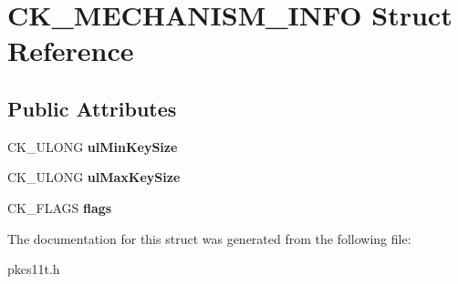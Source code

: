 \hypertarget{struct_c_k___m_e_c_h_a_n_i_s_m___i_n_f_o}{}\section{C\+K\+\_\+\+M\+E\+C\+H\+A\+N\+I\+S\+M\+\_\+\+I\+N\+FO Struct Reference}
\label{struct_c_k___m_e_c_h_a_n_i_s_m___i_n_f_o}
\subsection*{Public Attributes}
\begin{DoxyCompactItemize}
\item 
\mbox{\label{struct_c_k___m_e_c_h_a_n_i_s_m___i_n_f_o_a4cfb88703adbce245090f1761cf155c3}} 
C\+K\+\_\+\+U\+L\+O\+NG {\bfseries ul\+Min\+Key\+Size}
\item 
\mbox{\label{struct_c_k___m_e_c_h_a_n_i_s_m___i_n_f_o_ab5833180294f1a83f91a5ed8ccda92d6}} 
C\+K\+\_\+\+U\+L\+O\+NG {\bfseries ul\+Max\+Key\+Size}
\item 
\mbox{\label{struct_c_k___m_e_c_h_a_n_i_s_m___i_n_f_o_ad40ae095abd3c1512a5fc08ea208783a}} 
C\+K\+\_\+\+F\+L\+A\+GS {\bfseries flags}
\end{DoxyCompactItemize}


The documentation for this struct was generated from the following file\+:\begin{DoxyCompactItemize}
\item 
pkcs11t.\+h\end{DoxyCompactItemize}
